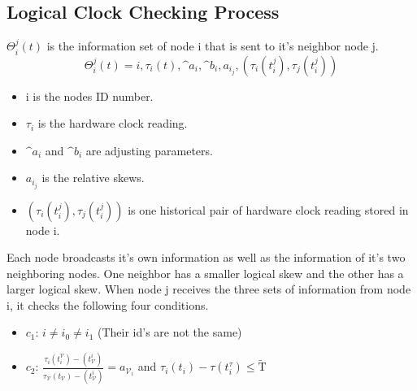 \documentclass{article}
\begin{document}
\subsection{Logical Clock Checking Process}
$\Theta^j_i(t)$ is the information set of node i that is sent to it's neighbor node j.
\begin{equation}
    \Theta^j_i(t) = {i,\tau_i(t), \^{a}_i,\^{b}_i,a_i_j,(\tau_i(t^j_i),\tau_j(t^j_i))} \nonumber
\end{equation}
\begin{itemize}
    \item i is the nodes ID number.
    \item $\tau_i$ is the hardware clock reading.
    \item $\^{a}_i$ and $\^{b}_i$ are adjusting parameters.
    \item $a_i_j$ is the relative skews.
    \item $(\tau_i(t^j_i),\tau_j(t^j_i))$ is one historical pair of hardware clock reading stored in node i.
\end{itemize}
Each node broadcasts it's own information as well as the information of it's two neighboring nodes. One neighbor has a smaller logical skew and the other has a larger logical skew. When node j receives the three sets of information from node i, it checks the following four conditions.
\begin{itemize}
    \item{$c_1$: $i \neq i_0 \neq i_1$ (Their id's are not the same)}
    \item{$c_2$: $\frac{\tau_i(t^\mathcal{V}_i) - (t^i_\mathcal{V})}{\tau_\mathcal{V}(t_\mathcal{V}) - (t^i_\mathcal{V})} = a_\mathcal{V}_i$ and $\tau_i(t_i) - \tau(t^\tau_i)\leq \tilde{\mathrm{T}}$}
\end{itemize}
\end{document}
